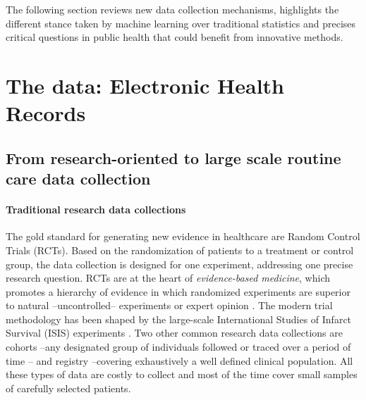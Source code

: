 \documentclass[french,12pt,twoside,a4paper]{book}
\begin{document}
The following section reviews new data collection mechanisms,
highlights the different stance taken by machine learning over traditional
statistics and precises critical questions in public health that could
benefit from innovative methods.

\section{The data: Electronic Health Records}\label{sec:intro:data}

\begin{background_box_left}

  \subsection{From research-oriented to large scale routine care data collection}%
  \label{subsec:intro:data_collections}

  \paragraph{Traditional research data collections}
  The gold standard for generating new evidence in healthcare are Random Control
  Trials (RCTs). Based on the randomization of patients to a treatment or
  control group, the data collection is designed for one experiment, addressing
  one precise research question. RCTs are at the heart of \emph{evidence-based
    medicine}, which promotes a hierarchy of evidence in which randomized
  experiments are superior to natural --uncontrolled-- experiments or expert
  opinion \citep{guyatt1995users}. The modern trial methodology has been shaped
  by the large-scale International Studies of Infarct Survival (ISIS)
  experiments \citep{isis1_randomised_1986}. Two other common research data
  collections are cohorts --any designated group of individuals followed or
  traced over a period of time \citep{porta2014dictionary}-- and registry
  --covering exhaustively a well defined clinical population. All these types of
  data are costly to collect and most of the time cover small samples of
  carefully selected patients.



\end{background_box_left}
\end{document}
